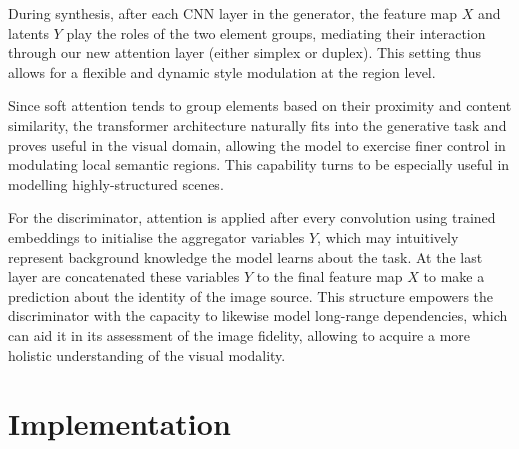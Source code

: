 \documentclass{article}
\begin{document}
	During synthesis, after each CNN layer in the generator, the feature map $X$ and latents $Y$ play 
	the roles of the two element groups, mediating their interaction through our new attention layer 
	(either simplex or duplex). 
	This setting thus allows for a flexible and dynamic style modulation at the region level. 
	
	Since soft attention tends to group elements based on their proximity and content similarity, the 
	transformer architecture naturally fits into the generative task and proves useful in the visual 
	domain, allowing the model to exercise finer control in modulating local semantic regions. This 
	capability turns to be especially useful in modelling highly-structured scenes.
	
	For the discriminator, attention is applied after every convolution using trained embeddings to 
	initialise the aggregator variables $Y$, which may intuitively represent background knowledge the 
	model learns about the task. At the last layer are concatenated these variables $Y$ to the final 
	feature map $X$ to make a prediction about the identity of the image source. 
	This structure empowers the discriminator with the capacity to likewise model long-range 
	dependencies, which can aid it in its assessment of the image fidelity, allowing to acquire a more 
	holistic understanding of the visual modality.
	
	\section{Implementation}
	
\end{document}
